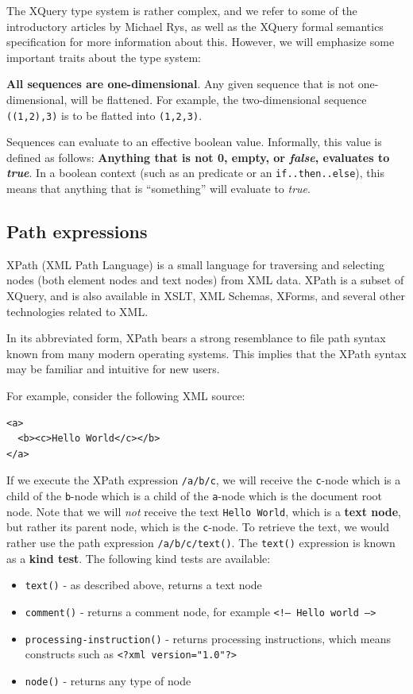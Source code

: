 The XQuery type system is rather complex, and we refer to some of the
introductory articles\cite{rys_xq_type_intro} by Michael Rys, as well as the
XQuery formal semantics specification\cite{xquery_semantics} for more
information about this. However, we will emphasize some important traits about
the type system:

\textbf{All sequences are one-dimensional}. Any given sequence that is not
one-dimensional, will be flattened. For example, the two-dimensional sequence
\verb!((1,2),3)! is to be flatted into \verb!(1,2,3)!.

Sequences can evaluate to an effective boolean value. Informally, this value is defined as follows:
\textbf{Anything that is not 0, empty, or \textit{false}, evaluates to \textit{true}}. In a boolean context (such
as an predicate or an \texttt{if..then..else}), this means that anything that is ``something'' will evaluate to
\textit{true}.


\subsection{Path expressions}
\label{sect:theory:xquery:PathExpressions}
XPath (XML Path Language) is a small language for traversing and selecting
nodes (both element nodes and text nodes) from XML data. XPath is a subset of
XQuery, and is also available in XSLT, XML Schemas, XForms, and several other
technologies related to XML. 

In its abbreviated form, XPath bears a strong resemblance to file path syntax
known from many modern operating systems. This implies that the XPath syntax
may be familiar and intuitive for new users.

For example, consider the following XML source:
\begin{center}
\begin{minipage}[h]{5.2cm}
\begin{verbatim}
<a>
  <b><c>Hello World</c></b>
</a>
\end{verbatim}
\end{minipage}
\end{center}
If we execute the XPath expression \verb!/a/b/c!, we will receive the
\verb!c!-node which is a child of the \verb!b!-node which is a child of the
\verb!a!-node which is the document root node. Note that we will \textit{not}
receive the text \texttt{Hello World}, which is a \textbf{text node}, but rather its
parent node, which is the \verb!c!-node. To retrieve the text, we would rather
use the path expression \verb!/a/b/c/text()!. The  \verb!text()! expression is
known as a \textbf{kind test}. The following kind tests are available:
\begin{itemize}
  \item \verb!text()! - as described above, returns a text node
  \item \verb!comment()! - returns a comment node, for example \texttt{<!-- Hello
  world -->}
  \item \verb!processing-instruction()! - returns processing instructions, which
  means constructs such as \texttt{<?xml version="1.0"?>}
  \item \verb!node()! - returns any type of node 
\end{itemize} 

